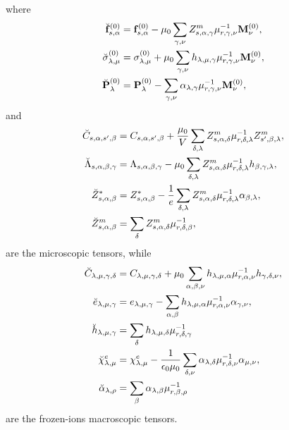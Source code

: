 \documentclass[12pt,a4paper,twoside]{report}
\begin{document}
where
\begin{align}
\breve {\bf f}^{(0)}_{s,\alpha}&= {\bf f}^{(0)}_{s,\alpha} - \mu_0 
\sum_{\gamma,\nu}
Z^m_{s,\alpha,\gamma} \mu^{-1}_{r,\gamma,\nu} {\bf M}^{(0)}_\nu, \\
\breve \sigma^{(0)}_{\lambda,\mu}&= \sigma^{(0)}_{\lambda,\mu}
+\mu_0 \sum_{\gamma,\nu} h_{\lambda,\mu,\gamma} \mu^{-1}_{r,\gamma,\nu} 
{\bf M}^{(0)}_\nu, \\
\breve {\bf P}^{(0)}_\lambda&= {\bf P}^{(0)}_\lambda -
\sum_{\gamma,\nu} \alpha_{\lambda,\gamma} \mu^{-1}_{r,\gamma,\nu} 
{\bf M}^{(0)}_\nu, \\
\end{align}
and
\begin{align}
\breve C_{s,\alpha,s',\beta} &= C_{s,\alpha,s',\beta}+
{\mu_0\over V}  \sum_{\delta,\lambda} Z^m_{s,\alpha,\delta}
\mu^{-1}_{r,\delta,\lambda}Z^m_{s',\beta,\lambda},\\
\breve \Lambda_{s,\alpha,\beta,\gamma} &= \Lambda_{s,\alpha,\beta,\gamma}
- \mu_0 \sum_{\delta,\lambda} Z^m_{s,\alpha,\delta}
\mu^{-1}_{r,\delta,\lambda} h_{\beta,\gamma,\lambda}, \\
\breve Z^*_{s,\alpha,\beta} &= Z^*_{s,\alpha,\beta}
-{1\over e} \sum_{\delta,\lambda} Z^m_{s,\alpha,\delta} 
\mu^{-1}_{r,\delta,\lambda} \alpha_{\beta,\lambda}, \\
\breve Z^m_{s,\alpha,\beta} &= \sum_{\delta} Z^m_{s,\alpha,\delta} 
\mu^{-1}_{r,\delta,\beta}, 
\end{align}
are the microscopic tensors, while
\begin{align}
\breve C_{\lambda,\mu,\gamma,\delta} &=
C_{\lambda,\mu,\gamma,\delta} + \mu_0 \sum_{\alpha,\beta,\nu}
h_{\lambda,\mu,\alpha} \mu^{-1}_{r,\alpha,\nu} 
h_{\gamma,\delta,\nu}, \\
\breve e_{\lambda,\mu,\gamma}&= e_{\lambda,\mu,\gamma}
-\sum_{\alpha,\beta} h_{\lambda,\mu,\alpha} \mu^{-1}_{r,\alpha,\nu}
\alpha_{\gamma,\nu}, \\
\breve h_{\lambda,\mu,\gamma}&= \sum_\delta h_{\lambda,\mu,\delta}
\mu^{-1}_{r,\delta,\gamma} \\
\breve \chi^e_{\lambda,\mu}&= \chi^e_{\lambda,\mu}
-{1\over \epsilon_0 \mu_0} \sum_{\delta,\nu} \alpha_{\lambda,\delta} 
\mu^{-1}_{r,\delta,\nu} \alpha_{\mu,\nu}, \\
\breve \alpha_{\lambda,\rho} &= \sum_\beta \alpha_{\lambda,\beta}
\mu^{-1}_{r,\beta,\rho}
\end{align}
are the frozen-ions macroscopic tensors.
\\
\newpage
\end{document}
